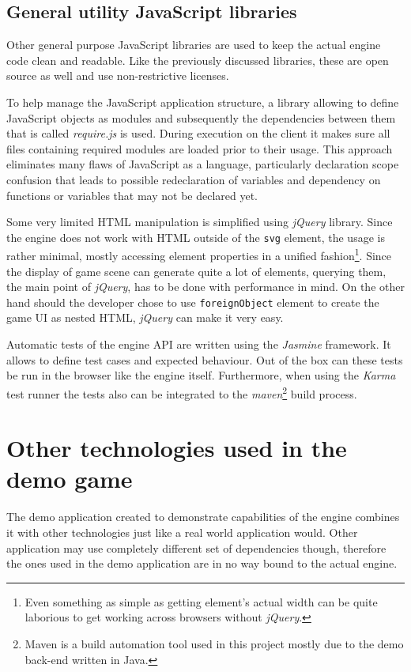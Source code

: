 \documentclass[11pt,oneside, final]{fithesis2}
\begin{document}
\subsection{General utility JavaScript libraries}
\label{jslibs}
Other general purpose JavaScript libraries are used to keep the actual engine code clean and readable. Like the previously discussed libraries, these are open source as well and use non-restrictive licenses.

To help manage the JavaScript application structure, a library allowing to define JavaScript objects as modules and subsequently the dependencies between them that is called \emph{require.js} is used. During execution on the client it makes sure all files containing required modules are loaded prior to their usage. \cite{requirejs} This approach eliminates many flaws of JavaScript as a language, particularly declaration scope confusion that leads to  possible redeclaration of variables and dependency on functions or variables that may not be declared yet.

Some very limited HTML manipulation is simplified using \emph{jQuery} library. Since the engine does not work with HTML outside of the \texttt{svg} element, the usage is rather minimal, mostly accessing element properties in a unified fashion\footnote{Even something as simple as getting element's actual width can be quite laborious to get working across browsers without \emph{jQuery}.}. Since the display of game scene can generate quite a lot of elements, querying them, the main point of \emph{jQuery}\cite{jquery}, has to be done with performance in mind. On the other hand should the developer chose to use \texttt{foreignObject} element to create the game UI as nested HTML, \emph{jQuery} can make it very easy.

Automatic tests of the engine API are written using the \emph{Jasmine} framework. It allows to define test cases and expected behaviour\cite{jasmine}. Out of the box can these tests be run in the browser like the engine itself. Furthermore, when using the \emph{Karma} test runner the tests also can be integrated to the \emph{maven}\footnote{Maven is a build automation tool\cite{maven} used in this project mostly due to the demo back-end written in Java.} build process\cite{karma}.

\section{Other technologies used in the demo game}
The demo application created to demonstrate capabilities of the engine combines it with other technologies just like a real world application would. Other application may use completely different set of dependencies though, therefore the ones used in the demo application are in no way bound to the actual engine.
\end{document}

